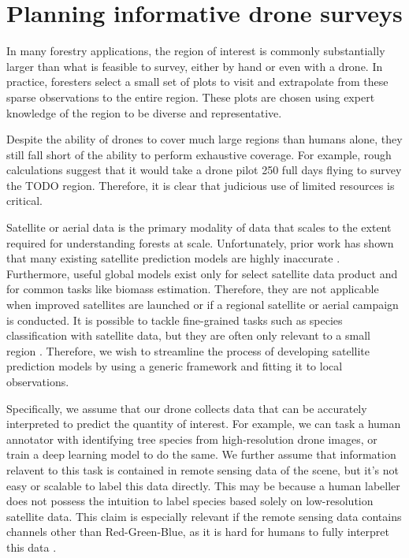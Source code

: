 \section{Planning informative drone surveys}

In many forestry applications, the region of interest is commonly substantially larger than what is feasible to survey, either by hand or even with a drone. In practice, foresters  select a small set of plots to visit and extrapolate from these sparse observations to the entire region. These plots are chosen using expert knowledge of the region to be diverse and representative.

Despite the ability of drones to cover much large regions than humans alone, they still fall short of the ability to perform  exhaustive coverage. For example, rough calculations suggest that it would take a drone pilot 250 full days flying to survey the TODO region. Therefore, it is clear that judicious use of limited resources is critical.

Satellite or aerial data is the primary modality of data that scales to the extent required for understanding forests at scale. Unfortunately, prior work has shown that many existing satellite prediction models are highly inaccurate \cite{}. Furthermore, useful global models exist only for select satellite data product and for common tasks like biomass estimation. Therefore, they are not applicable when improved satellites are launched or if a regional satellite or aerial campaign is conducted.
It is possible to tackle fine-grained tasks such as species classification with satellite data, but they are often only relevant to a small region \cite{Sweden}. 
Therefore, we wish to streamline the process of developing satellite prediction models by using a generic framework and fitting it to local observations.

Specifically, we assume that our drone collects data that can be accurately interpreted to predict the quantity of interest. For example, we can task a human annotator with identifying tree species from high-resolution drone images, or train a deep learning model to do the same. We further assume that information relavent to this task is contained in remote sensing data of the scene, but it's not easy or scalable to label this data directly. This may be because a human labeller does not possess the intuition to label species based solely on low-resolution satellite data. This claim is especially relevant if the remote sensing data contains channels other than Red-Green-Blue, as it is hard for humans to fully interpret this data \cite{Hard to label multispectral}.

